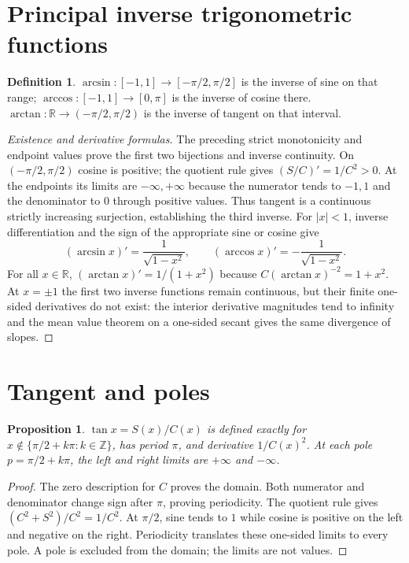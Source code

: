 \documentclass[11pt,oneside,a4paper]{book}
\newtheorem{proposition}[theorem]{Proposition}
\theoremstyle{definition}
\newtheorem{definition}[theorem]{Definition}
\theoremstyle{remark}
\newcommand{\Z}{\mathbb Z}
\newcommand{\R}{\mathbb R}
\newcommand{\KEntry}[2]{\Needspace{7\baselineskip}\section{#2}\label{#1}{\small\sffamily\color{black!60}\detokenize{#1}}\par}
\begin{document}
\KEntry{K03.07.trig_inverses}{Principal inverse trigonometric functions}
\begin{definition}
$\arcsin:[-1,1]\to[-\pi/2,\pi/2]$ is the inverse of sine on that range;
$\arccos:[-1,1]\to[0,\pi]$ is the inverse of cosine there.
$\arctan:\R\to(-\pi/2,\pi/2)$ is the inverse of tangent on that interval.
\end{definition}
\begin{proof}[Existence and derivative formulas]
The preceding strict monotonicity and endpoint values prove the first two
bijections and inverse continuity. On $(-\pi/2,\pi/2)$ cosine is positive;
the quotient rule gives $(S/C)'=1/C^2>0$. At the endpoints its limits are
$-\infty,+\infty$ because the numerator tends to $-1,1$ and the
denominator to $0$ through positive values. Thus tangent is a continuous
strictly increasing surjection, establishing the third inverse.
For $|x|<1$, inverse differentiation and the sign of the appropriate sine
or cosine give
\[(\arcsin x)'=\frac1{\sqrt{1-x^2}},\qquad
(\arccos x)'=-\frac1{\sqrt{1-x^2}}.
\]
For all $x\in\R$, $(\arctan x)'=1/(1+x^2)$ because
$C(\arctan x)^{-2}=1+x^2$. At $x=\pm1$ the first two inverse functions
remain continuous, but their finite one-sided derivatives do not exist:
the interior derivative magnitudes tend to infinity and the mean value
theorem on a one-sided secant gives the same divergence of slopes.
\end{proof}

\KEntry{K03.07.tan}{Tangent and poles}
\begin{proposition}
$\tan x=S(x)/C(x)$ is defined exactly for
$x\notin\{\pi/2+k\pi:k\in\Z\}$, has period $\pi$, and derivative
$1/C(x)^2$. At each pole $p=\pi/2+k\pi$, the left and right limits
are $+\infty$ and $-\infty$.
\end{proposition}
\begin{proof}
The zero description for $C$ proves the domain. Both numerator and
denominator change sign after $\pi$, proving periodicity.
The quotient rule gives $(C^2+S^2)/C^2=1/C^2$.
At $\pi/2$, sine tends to $1$ while cosine is positive on the left and
negative on the right. Periodicity translates these one-sided limits to
every pole. A pole is excluded from the domain; the limits are not values.
\end{proof}
\end{document}
